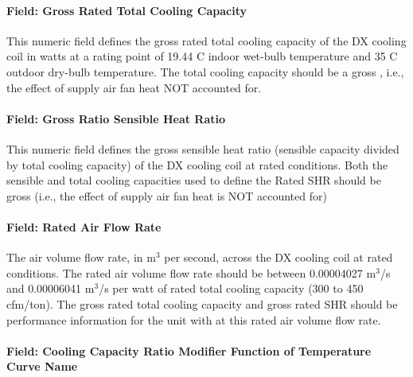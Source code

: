 \paragraph{Field: Gross Rated Total Cooling Capacity}\label{field-gross-rated-total-cooling-capacity}

This numeric field defines the gross rated total cooling capacity of the DX cooling coil in watts at a rating point of 19.44 C indoor wet-bulb temperature and 35 C outdoor dry-bulb temperature. The total cooling capacity should be a gross , i.e., the effect of supply air fan heat NOT accounted for.

\paragraph{Field: Gross Ratio Sensible Heat Ratio}\label{field-gross-ratio-sensible-heat-ratio}

This numeric field defines the gross sensible heat ratio (sensible capacity divided by total cooling capacity) of the DX cooling coil at rated conditions. Both the sensible and total cooling capacities used to define the Rated SHR should be gross (i.e., the effect of supply air fan heat is NOT accounted for)

\paragraph{Field: Rated Air Flow Rate}\label{field-rated-air-flow-rate}

The air volume flow rate, in m\(^{3}\) per second, across the DX cooling coil at rated conditions. The rated air volume flow rate should be between 0.00004027 m\(^{3}\)/s and 0.00006041 m\(^{3}\)/s per watt of rated total cooling capacity (300 to 450 cfm/ton). The gross rated total cooling capacity and gross rated SHR should be performance information for the unit with at this rated air volume flow rate.

\paragraph{Field: Cooling Capacity Ratio Modifier Function of Temperature Curve Name}\label{field-cooling-capacity-ratio-modifier-function-of-temperature-curve-name}

